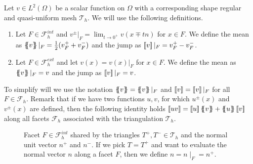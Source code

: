     Let $v\in L^2( \Omega ) $ be a scalar function on $\Omega$ with a corresponding shape regular and quasi-uniform mesh $\mathcal{T}_{h} $. We will use the following definitions.
    \begin{enumerate}[label=\arabic*)]
        \item Let $F \in \mathcal{F}^{int} _{h}$ and $v^{\pm}| _{F} = \lim_{t\to 0^{+}} v( x \mp tn)   $ for $x \in F$. We define the mean as $\left\{\!\!\left\{ v\right\}\!\!\right\} |_{F} = \frac{1}{2} (v^{+}_{F} + v^{-}_{F})   $ and the jump as $\left[\!\left[ v \right]\!\right]|_{F} =  v^{+}_{F} - v^{-}_{F} $.
        \item Let $F \in \mathcal{F}^{ext} _{h}$ and let $ v( x) =  v(x)|_{F} $ for  $x \in F$.
We define the mean as $\left\{\!\!\left\{ v\right\}\!\!\right\} |_{F} = v    $ and the jump as $\left[\!\left[ v \right]\!\right]|_{F} = v$.

    \end{enumerate}
    To simplify will we use the notation $\mean{ v } = \mean{ v }|_{F}    $ and $\left[\!\left[  v  \right]\!\right] = \left[\!\left[  v  \right]\!\right]| _{F}    $ for all $F \in \mathcal{F} _{h}$.
    Remark that if we have two functions $u,v$, for which $u^{\pm}( x) $ and $v^{\pm}( x) $ are defined, then the following identity holds $  \jump{ uv }    = \jump{ u }   \mean{ v }    + \mean{ u }  \jump{ v }$ along all facets $ \mathcal{F}_{h} $ associated with the
    triangulation $\mathcal{T} _{h}$.


\begin{figure}[h!]
\centering
{}

\caption{Facet $F \in \mathcal{F}_h^{int} $ shared by the triangles $T^{+}, T^{-} \in \mathcal{T}_{h} $ and the normal unit vector $n^{+}$ and $n^{-}$. If we pick $T=T^{+}$ and want to evaluate the normal vector $n$ along a facet $F$, then we define $n = n  \mid _{F} = n^{+}$.}
    \label{fig:normal}
\end{figure}



